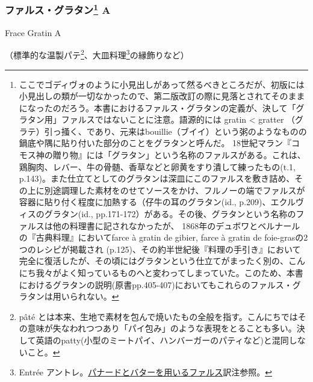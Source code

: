 \begin{recette}

\atoaki{}

\hypertarget{farce-gratin-a}{%
\subsubsection[ファルス・グラタン
A]{\texorpdfstring{ファルス・グラタン\footnote{ここでゴディヴォのように小見出しがあって然るべきところだが、初版には小見出しの類が一切なかったので、第二版改訂の際に見落とされてそのままになったのだろう。本書におけるファルス・グラタンの定義が、決して「グラタン用」ファルスではないことに注意。語源的には
  gratin \textless{} gratter
  （グラテ）引っ掻く、であり、元来はbouillie（ブイイ）という粥のようなものの鍋底や隅に貼り付いた部分のことをグラタンと呼んだ。
  18世紀マラン『コモス神の贈り物』には「グラタン」という名称のファルスがある。これは、鶏胸肉、レバー、牛の骨髄、香草などと卵黄をすり潰して練ったもの(t.1,
  p.143)。また仕立てとしてのグラタンは深皿にこのファルスを敷き詰め、その上に別途調理した素材をのせてソースをかけ、フルノーの端でファルスが容器に貼り付く程度に加熱する（仔牛の耳のグラタン(id.,
  p.209)、エクルヴィスのグラタン(id.,
  pp.171-172）がある。その後、グラタンという名称のファルスは他の料理書に記されなかったが、
  1868年のデュボワとベルナールの『古典料理』においてfarce à gratin de
  gibier, farce à gratin de foie-grasの2つのレシピが掲載され
  (p.125)、その約半世紀後『料理の手引き』において完全に復活したが、その頃にはグラタンという仕立てがまったく別の、こんにち我々がよく知っているものへと変わってしまっていた。このため、本書におけるグラタンの説明(原書pp.405-407)においてもこれらのファルス・グラタンは用いられない。}
A}{ファルス・グラタン A}}\label{farce-gratin-a}}

\begin{frsubenv}

Frace Gratin A

\end{frsubenv}


（標準的な温製パテ\footnote{pâté
  とは本来、生地で素材を包んで焼いたもの全般を指す。こんにちではその意味が失なわれつつあり「パイ包み」のような表現をとることも多い。決して英語のpatty(小型のミートパイ、ハンバーガーのパティなど)と混同しないこと。}、大皿料理\footnote{Entrée
  アントレ。\protect\hyperlink{panade-a}{パナードとバターを用いるファルス}訳注参照。}の縁飾りなど）


\end{recette}
